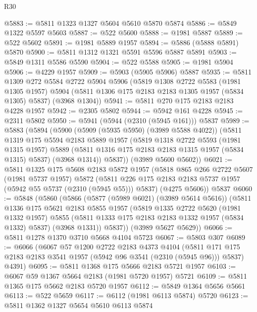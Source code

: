 \begin{lexlean}{R30}
\begin{coremodule}
@5883 := @5811 @1323 @1327 @5604 @5610 @5870 @5874
@5886 := @5849 @1322 @5597 @5603
@5887 := @522 @5600
@5888 := @1981 @5887
@5889 := @522 @5602
@5891 := @1981 @5889 @1957
@5894 := @5886 (@5888 @5891) @5870
@5900 := @5811 @1312 @1321 @5591 @5596 @5887 @5891
@5903 := @5849 @1311 @5586 @5590
@5904 := @522 @5588
@5905 := @1981 @5904
@5906 := @4229 @1957
@5909 := @5903 (@5905 @5906) @5887
@5935 := @5811
    @1309
    @272
    @5584
    @2722
    @5904
    @5906
    (@5819
      @1308
      @2722
      @5583
      (@1981 @1305 @1957)
      @5904
      (@5811 @1306 @175 @2183 @2183 @1305 @1957 (@5834 @1305) @5837)
      (@3968 @1304))
@5941 := @5811 @270 @175 @2183 @2183 @4228 @1957
@5942 := @2305 @5802
@5944 := @5942 @161 @4228
@5945 := @2311 @5802
@5950 := @5941 (@5944 (@2310 (@5945 @161))) @5837
@5989 := @5883
    (@5894
      (@5900
        (@5909 (@5935 @5950) (@3989 @5588 @4022))
        (@5811
          @1319
          @175
          @5594
          @2183
          @5889
          @1957
          (@5819
            @1318
            @2722
            @5593
            (@1981 @1315 @1957)
            @5889
            (@5811 @1316 @175 @2183 @2183 @1315 @1957 (@5834 @1315) @5837)
            (@3968 @1314))
          @5837))
      (@3989 @5600 @5602))
@6021 := @5811
    @1325
    @175
    @5608
    @2183
    @5872
    @1957
    (@5818
      @865
      @266
      @2722
      @5607
      (@1981 @5737 @1957)
      @5872
      (@5811 @226 @175 @2183 @2183 @5737 @1957 (@5942 @55 @5737 (@2310 (@5945 @55))) @5837)
      (@4275 @5606))
    @5837
@6060 := @5848
    (@5860
      (@5866
        (@5877 (@5989 @6021) (@3989 @5614 @5616))
        (@5811
          @1336
          @175
          @5621
          @2183
          @5855
          @1957
          (@5819
            @1335
            @2722
            @5620
            (@1981 @1332 @1957)
            @5855
            (@5811 @1333 @175 @2183 @2183 @1332 @1957 (@5834 @1332) @5837)
            (@3968 @1331))
          @5837))
      (@3989 @5627 @5629))
@6066 := @5811 @1278 @1370 @3710 @5668 @4104 @5723
@6067 := @5803 @307
@6089 := @6066
    (@6067
      @57
      @1200
      @2722
      @2183
      @4373
      @4104
      (@5811 @171 @175 @2183 @2183 @3541 @1957 (@5942 @96 @3541 (@2310 (@5945 @96))) @5837)
      @4391)
@6095 := @5811 @1368 @175 @5666 @2183 @5721 @1957
@6103 := @6067 @59 @1367 @5664 @2183 (@1981 @5720 @1957) @5721
@6109 := @5811 @1365 @175 @5662 @2183 @5720 @1957
@6112 := @5849 @1364 @5656 @5661
@6113 := @522 @5659
@6117 := @6112 (@1981 @6113 @5874) @5720
@6123 := @5811 @1362 @1327 @5654 @5610 @6113 @5874

\end{coremodule}
\end{lexlean}
